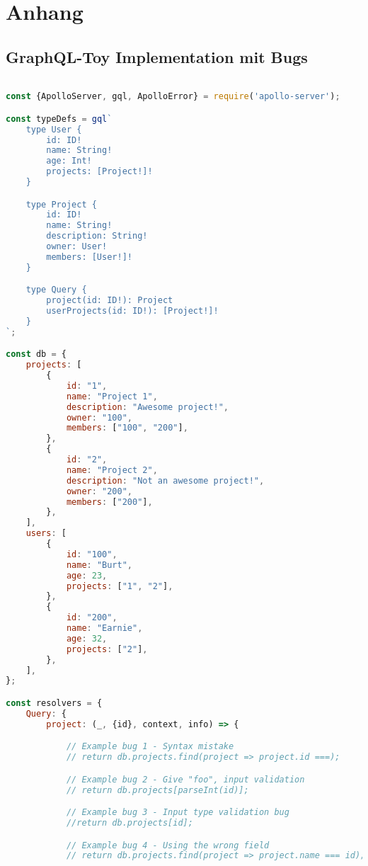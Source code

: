 \chapter{Anhang}

\section*{GraphQL-Toy Implementation mit Bugs}
\label{graphql-toy-code}
\begin{lstlisting}[language=javascript]

const {ApolloServer, gql, ApolloError} = require('apollo-server');

const typeDefs = gql`
    type User {
        id: ID!
        name: String!
        age: Int!
        projects: [Project!]!
    }

    type Project {
        id: ID!
        name: String!
        description: String!
        owner: User!
        members: [User!]!
    }

    type Query {
        project(id: ID!): Project
        userProjects(id: ID!): [Project!]!
    }
`;

const db = {
    projects: [
        {
            id: "1",
            name: "Project 1",
            description: "Awesome project!",
            owner: "100",
            members: ["100", "200"],
        },
        {
            id: "2",
            name: "Project 2",
            description: "Not an awesome project!",
            owner: "200",
            members: ["200"],
        },
    ],
    users: [
        {
            id: "100",
            name: "Burt",
            age: 23,
            projects: ["1", "2"],
        },
        {
            id: "200",
            name: "Earnie",
            age: 32,
            projects: ["2"],
        },
    ],
};

const resolvers = {
    Query: {
        project: (_, {id}, context, info) => {

            // Example bug 1 - Syntax mistake
            // return db.projects.find(project => project.id ===);

            // Example bug 2 - Give "foo", input validation
            // return db.projects[parseInt(id)];

            // Example bug 3 - Input type validation bug
            //return db.projects[id];

            // Example bug 4 - Using the wrong field
            // return db.projects.find(project => project.name === id);


\end{lstlisting}
